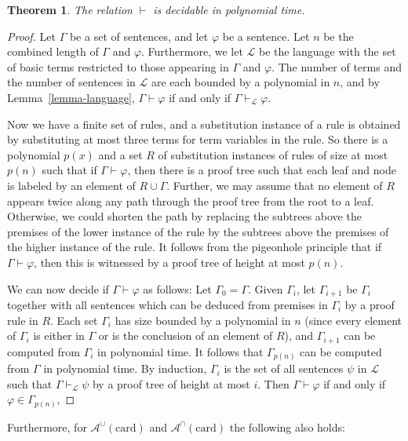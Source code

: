 \documentclass[letterpaper]{article}
\newtheorem{theorem}{Theorem}[section]
\theoremstyle{definition}
\newcommand{\Aunion}{\mathscr{A}^{\cup}}
\newcommand{\Ainter}{\mathscr{A}^{\cap}}
\newcommand{\card}{\mathrm{card}}
\begin{document}
\begin{theorem}
\label{theorem-ptime}
The relation $\vdash$ is decidable in polynomial time. 
\end{theorem}
\begin{proof}
Let $\Gamma$ be a set of sentences, and let $\varphi$ be a sentence. Let $n$ be the combined length of $\Gamma$ and $\varphi$. Furthermore, we let $\mathcal{L}$ be the language with the set of basic terms restricted to those appearing in $\Gamma$ and $\varphi$. The number of terms and the number of sentences in $\mathcal{L}$ are each bounded by a polynomial in $n$, and by Lemma~\ref{lemma-language}, $\Gamma\vdash \varphi$ if and only if $\Gamma\vdash_{\mathcal{L}} \varphi$.

Now we have a finite set of rules, and a substitution instance of a rule is obtained by substituting at most three terms for term variables in the rule. So there is a polynomial $p(x)$ and a set $R$ of substitution instances of rules of size at most $p(n)$ such that if $\Gamma\vdash \varphi$, then there is a proof tree such that each leaf and node is labeled by an element of $R\cup \Gamma$. Further, we may assume that no element of $R$ appears twice along any path through the proof tree from the root to a leaf. Otherwise, we could shorten the path by replacing the subtrees above the premises of the lower instance of the rule by the subtrees above the premises of the higher instance of the rule. It follows from the pigeonhole principle that if $\Gamma\vdash \varphi$, then this is witnessed by a proof tree of height at most $p(n)$. 

We can now decide if $\Gamma\vdash \varphi$ as follows: Let $\Gamma_0 = \Gamma$. Given $\Gamma_i$, let $\Gamma_{i+1}$ be $\Gamma_i$ together with all sentences which can be deduced from premises in $\Gamma_i$ by a proof rule in $R$. Each set $\Gamma_i$ has size bounded by a polynomial in $n$ (since every element of $\Gamma_i$ is either in $\Gamma$ or is the conclusion of an element of $R$), and $\Gamma_{i+1}$ can be computed from $\Gamma_i$ in polynomial time. It follows that $\Gamma_{p(n)}$ can be computed from $\Gamma$ in polynomial time. By induction, $\Gamma_i$ is the set of all sentences $\psi$ in $\mathcal{L}$ such that $\Gamma\vdash_{\mathcal{L}} \psi$ by a proof tree of height at most $i$. Then $\Gamma\vdash \varphi$ if and only if $\varphi\in \Gamma_{p(n)}$, 
\end{proof}

Furthermore, for $\Aunion(\card)$ and $\Ainter(\card)$ the following also holds:
\end{document}
